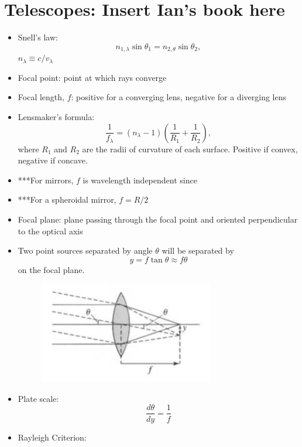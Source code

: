 \documentclass[12pt]{article}
\begin{document}
\section{Telescopes: Insert Ian's book here}
\begin{itemize}
\item Snell's law:
\begin{equation}
n_{1,\lambda}\sin\theta_1 = n_{2,\theta}\sin\theta_2,
\end{equation}
$n_\lambda \equiv c/v_\lambda$
\item Focal point: point at which rays converge
\item Focal length, $f$: positive for a converging lens, negative for a diverging lens
\item Lensmaker's formula:
\begin{equation}
\frac{1}{f_\lambda} = (n_\lambda - 1)\left(\frac{1}{R_1} + \frac{1}{R_2}\right),
\end{equation}
where $R_1$ and $R_2$ are the radii of curvature of each surface. Positive if convex, negative if concave.
\item ***For mirrors, $f$ is wavelength independent since 
\item ***For a spheroidal mirror, $f = R/2$
\item Focal plane: plane passing through the focal point and oriented perpendicular to the optical axis
\item Two point sources separated by angle $\theta$ will be separated by
\begin{equation}
y = f\tan \theta \approx f\theta
\end{equation}
on the focal plane.
\begin{figure}[h!]
\centering
\includegraphics[width=3in]{CandOfigs/pointsources_focalplane.png}
\end{figure}
\item Plate scale:
\begin{equation}
\frac{d\theta}{dy} = \frac{1}{f}
\end{equation}
\item Rayleigh Criterion:

\end{itemize}
\end{document}
